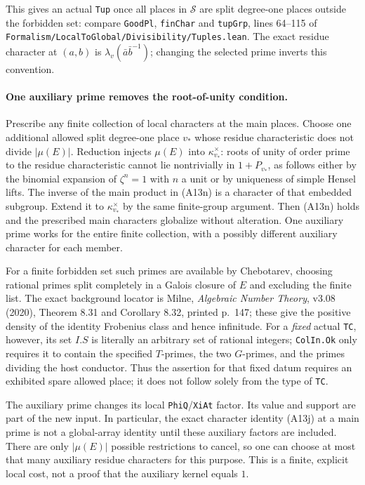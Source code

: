 This gives an actual \texttt{Tup} once all places in
$\mathcal S$ are split degree-one places outside the
forbidden set: compare \texttt{GoodPl}, \texttt{finChar}
and \texttt{tupGrp}, lines 64--115 of
\texttt{Formalism/LocalToGlobal/Divisibility/Tuples.lean}.
The exact residue character at $(a,b)$ is
$\lambda_v(\bar a\bar b^{-1})$; changing the selected
prime inverts this convention.

\paragraph{One auxiliary prime removes the root-of-unity condition.}
Prescribe any finite collection of local characters at the
main places.  Choose one additional allowed split degree-one
place $v_*$ whose residue characteristic does not divide
$|\mu(E)|$.  Reduction injects $\mu(E)$ into
$\kappa_{v_*}^\times$: roots of unity of order prime to
the residue characteristic cannot lie nontrivially in
$1+P_{v_*}$, as follows either by the binomial expansion
of $\zeta^n=1$ with $n$ a unit or by uniqueness of simple
Hensel lifts.  The inverse of the main product in (A13n)
is a character of that embedded subgroup.  Extend it to
$\kappa_{v_*}^\times$ by the same finite-group argument.
Then (A13n) holds and the prescribed main characters
globalize without alteration.  One auxiliary prime works
for the entire finite collection, with a possibly different
auxiliary character for each member.

For a finite forbidden set such primes are available by
Chebotarev, choosing rational primes split completely in
a Galois closure of $E$ and excluding the finite list.
The exact background locator is Milne, \emph{Algebraic Number
Theory}, v3.08 (2020), Theorem 8.31 and Corollary 8.32,
printed p.~147; these give the positive density of the
identity Frobenius class and hence infinitude.
For a \emph{fixed} actual \texttt{TC}, however, its set
$I.S$ is literally an arbitrary set of rational integers;
\texttt{ColIn.Ok} only requires it to contain the specified
$T$-primes, the two $G$-primes, and the primes dividing
the host conductor.  Thus the assertion for that fixed
datum requires an exhibited spare allowed place; it does
not follow solely from the type of \texttt{TC}.

The auxiliary prime changes its local \texttt{PhiQ}/\texttt{XiAt}
factor.  Its value and support are part of the new input.
In particular, the exact character identity (A13j)
at a main prime is not a global-array identity until
these auxiliary factors are included.  There are only
$|\mu(E)|$ possible restrictions to cancel, so one can
choose at most that many auxiliary residue characters
for this purpose.  This is a finite, explicit local cost,
not a proof that the auxiliary kernel equals $1$.

